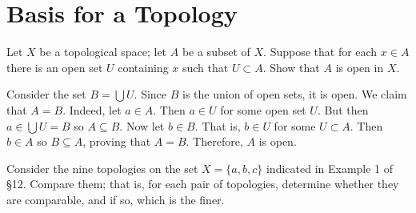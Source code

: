 \documentclass[../../master.tex]{subfiles}
\begin{document}
\section{Basis for a Topology}

\begin{exercise}
    Let $X$ be a topological space; let $A$ be a subset of $X$.
    Suppose that for each $x \in A$ there is an open set $U$ containing $x$ such that $U \subset A$.
    Show that $A$ is open in $X$.
\end{exercise}

\begin{solution}
    Consider the set $B = \bigcup U$.
    Since $B$ is the union of open sets, it is open.
    We claim that $A = B$. 
    Indeed, let $a \in A$.
    Then $a \in U$ for some open set $U$.
    But then $a \in \bigcup U = B$ so $A \subseteq B$.
    Now let $b \in B$. 
    That is, $b \in U$ for some $U \subset A$.
    Then $b \in A$ so $B \subseteq A$, proving that $A = B$. 
    Therefore, $A$ is open.
\end{solution}

\begin{exercise}
    Consider the nine topologies on the set $X = \{a, b, c\}$ indicated in Example 1 of \S 12.
    Compare them; that is, for each pair of topologies, determine whether they are comparable, and if so, which is the finer.
\end{exercise}
\end{document}
